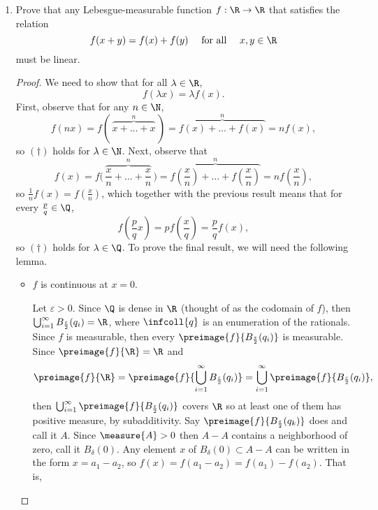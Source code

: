 \documentclass[12pt,letterpaper]{article}
\begin{document}
\begin{enumerate}
\pagebreak
\item Prove that any Lebesgue-measurable function $f:\R\to\R$ that satisfies the relation 
$$f(x+y)=f(x)+f(y)\quad \text{ for all } \quad x,y\in\R$$
must be linear. 
\begin{proof}
We need to show that for all $\lambda\in \R$, 
\begin{equation} \tag{$\dagger$}
f(\lambda x)=\lambda f(x).
\end{equation}
First, observe that for any $n\in \N$,
$$f(nx)=f(\,\overbrace{x+\dots+x}^n\,)=\overbrace{f(x)+\dots+f(x)}^n=nf(x),$$
so $(\dagger)$ holds for $\lambda\in \N$. Next, observe that 
$$f(x)=f\bigg(\,\overbrace{\frac{x}{n}+\dots+\frac{x}{n}}^n\,\bigg)=\overbrace{f\left(\frac{x}{n}\right)+\dots+f\left(\frac{x}{n}\right)}^n=nf\left(\frac{x}{n}\right),$$
so $\frac{1}{n}f\left(x\right)=f\left(\frac{x}{n}\right)$, which together with the previous result means that for every $\frac{p}{q}\in\Q$, 
$$f\left(\frac{p}{q}x\right)=pf\left(\frac{x}{q}\right)=\frac{p}{q}f\left(x\right),$$
so $(\dagger)$ holds for $\lambda\in \Q$. To prove the final result, we will need the following lemma.
	\begin{itemize}
	\item[\,]\vspace*{-18pt}
	\begin{lemma*}
	$f$ is continuous at $x=0$. 
	\end{lemma*}
	Let $\varepsilon>0$. Since $\Q$ is dense in $\R$ (thought of as the codomain of $f$), then $\bigcup_{i=1}^\infty B_\frac{\varepsilon}{2}(q_i)=\R$, where $\infcoll{q}$ is an enumeration of the rationals. Since $f$ is measurable, then every $\preimage{f}{B_\frac{\varepsilon}{2}(q_i)}$ is measurable. Since $\preimage{f}{\R}=\R$ and 
	$$\preimage{f}{\R}=\preimage{f}{\bigcup_{i=1}^\infty B_\frac{\varepsilon}{2}(q_i)}=\bigcup_{i=1}^\infty\preimage{f}{B_\frac{\varepsilon}{2}(q_i)},$$
	then $\bigcup_{i=1}^\infty\preimage{f}{B_\frac{\varepsilon}{2}(q_i)}$ covers $\R$ so at least one of them has positive measure, by subadditivity. Say $\preimage{f}{B_\frac{\varepsilon}{2}(q_k)}$ does and call it $A$. Since $\measure{A}>0$ then $A-A$ contains a neighborhood of zero, call it $B_\delta(0)$. Any element $x$ of $B_\delta(0)\subset A-A$ can be written in the form $x=a_1-a_2$, so $f(x)=f(a_1-a_2)=f(a_1)-f(a_2)$. That is, 

\end{itemize}
\end{proof}
\end{enumerate}
\end{document}
